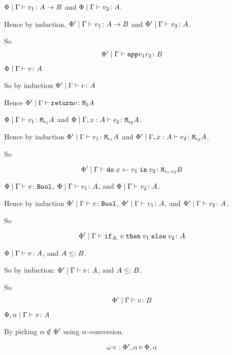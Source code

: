 {    
    \bi $\Phi\mid\Gamma \vdash v_1 \colon A\rightarrow B$ and $\Phi\mid\Gamma \vdash v_2 \colon A$.

    Hence by induction,
    $\Phi'\mid\Gamma \vdash v_1 \colon A\rightarrow B$ and $\Phi'\mid\Gamma \vdash v_2 \colon A$.

    So $$\Phi'\mid\Gamma \vdash \texttt{app}{v_1}{v_2} \colon B$$


    \bi $\Phi\mid\Gamma \vdash v \colon A$ 
    
    So by induction $\Phi'\mid\Gamma \vdash v \colon A$

    Hence $\Phi'\mid\Gamma \vdash \texttt{return} v \colon \texttt{M}_{\texttt{1}}{A}$


    \bi $\Phi\mid\Gamma \vdash v_1 \colon \texttt{M}_{\epsilon_1}{A}$ and $\Phi\mid\Gamma, x: A \vdash \epsilon_2 \colon \texttt{M}_{\epsilon_2}{A}$.

    Hence by induction $\Phi'\mid\Gamma \vdash v_1 \colon \texttt{M}_{\epsilon_1}{A}$ and $\Phi'\mid\Gamma, x: A \vdash v_2 \colon \texttt{M}_{\epsilon_2}{A}$.

    So

    \begin{equation}
        \Phi'\mid\Gamma \vdash \texttt{do}\; x \leftarrow v_1 \;\texttt{in}\; v_2 \colon \texttt{M}_{\epsilon_1\cdot\epsilon_2}{B}
    \end{equation}


    \bi $\Phi\mid\Gamma \vdash v \colon \texttt{Bool}$, $\Phi\mid\Gamma \vdash v_1 \colon A$, and $\Phi\mid\Gamma \vdash v_2 \colon A$.

    Hence by induction
    $\Phi'\mid\Gamma \vdash v \colon \texttt{Bool}$, $\Phi'\mid\Gamma \vdash v_1 \colon A$, and $\Phi'\mid\Gamma \vdash v_2 \colon A$.

    So 

    \begin{equation}
        \Phi'\mid\Gamma \vdash \texttt{if}_{A, }\; v\; \texttt{then}\; v_1 \;\texttt{else} \; v_2 \colon A
    \end{equation}

    \bi $\Phi\mid\Gamma \vdash v \colon A$, and $A\leq: B$.

    So by induction:
    $\Phi'\mid\Gamma \vdash v \colon A$, and $A\leq: B$.

    So \begin{equation}
        \Phi'\mid\Gamma \vdash v \colon B
    \end{equation}

    \bi $\Phi, \alpha\mid\Gamma \vdash v \colon A$

    By picking $\alpha\notin\Phi'$ using $\alpha$-conversion.

    \begin{equation}
        \omega\times : \Phi',\alpha \triangleright \Phi,\alpha
    \end{equation}

}
